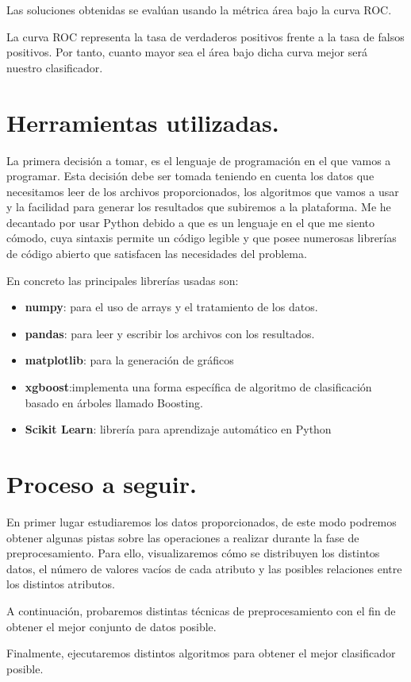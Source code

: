 Las soluciones obtenidas se evalúan usando la métrica área bajo la curva ROC.
\medskip

La curva ROC representa la tasa de verdaderos positivos frente a la tasa de falsos positivos. Por tanto, cuanto mayor sea el área bajo dicha curva mejor será nuestro clasificador.


\section{Herramientas utilizadas.}


La primera decisión a tomar, es el lenguaje de programación en el que vamos a programar. Esta decisión debe ser tomada teniendo en cuenta los datos que necesitamos leer de los archivos proporcionados, los algoritmos que vamos a usar y la facilidad para generar los resultados que subiremos a la plataforma. Me he decantado por usar Python debido a que es un lenguaje en el que me siento cómodo, cuya sintaxis permite un código legible y que posee numerosas librerías de código abierto que satisfacen las necesidades del problema.
\medskip

En concreto las principales librerías usadas son:
\begin{itemize}
	\item \textbf{numpy}: para el uso de arrays y el tratamiento de los datos.
	\item \textbf{pandas}: para leer y escribir los archivos con los resultados.
	\item \textbf{matplotlib}: para la generación de gráficos
	\item \textbf{xgboost}\cite{xgboost}:implementa una forma específica de
	algoritmo de clasificación basado en árboles llamado Boosting.
	\item \textbf{Scikit Learn}\cite{scikit-learn}: librería para aprendizaje automático en Python
\end{itemize}

\section{Proceso a seguir.}
En primer lugar estudiaremos los datos proporcionados, de este modo podremos obtener algunas pistas sobre las operaciones a realizar durante la fase de preprocesamiento.
Para ello, visualizaremos cómo se distribuyen los distintos datos, el número de valores vacíos de cada atributo y las posibles relaciones entre los distintos atributos.
\medskip

A continuación, probaremos distintas técnicas de preprocesamiento con el fin de obtener el mejor conjunto de datos posible. 
\medskip

Finalmente, ejecutaremos distintos algoritmos para obtener el mejor clasificador posible.
